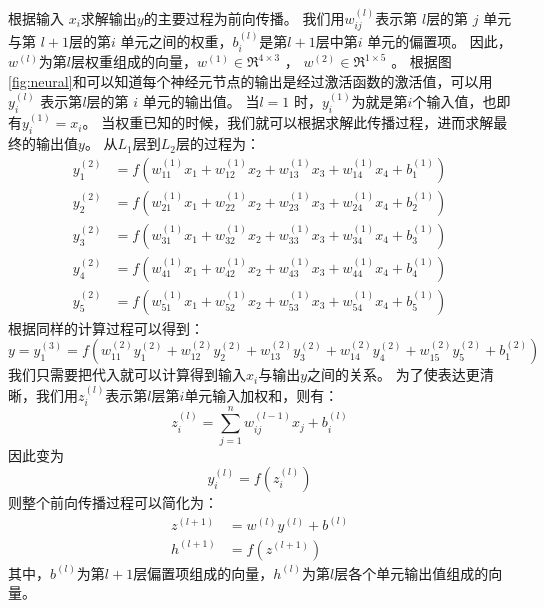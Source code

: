 根据输入 $x_i$求解输出$y$的主要过程为前向传播。
我们用$ w^{(l)}_{ij}$表示第 $ l $层的第 $ j$ 单元与第 $ l+1 $层的第$  i$ 单元之间的权重，$ b^{(l)}_i $是第$  l+1 $层中第$  i$ 单元的偏置项。
因此，$w^{(l)}$为第$l$层权重组成的向量，$ w^{(1)} \in \Re^{4\times 3}$ ， $ w^{(2)} \in \Re^{1\times 5}$ 。
根据图\ref{fig:neural}和可以知道每个神经元节点的输出是经过激活函数的激活值，可以用$ y^{(l)}_i$ 表示第$  l $层的第 $ i$ 单元的输出值。
当$  l=1$ 时，$  y^{(1)}_i$为就是第$  i $个输入值，也即有$  y^{(1)}_i = x_i $。
当权重已知的时候，我们就可以根据求解此传播过程，进而求解最终的输出值$y$。
从$L_1$层到$L_2$层的过程为：
\begin{align}
  y_1^{(2)} &= f(w_{11}^{(1)}x_1 + w_{12}^{(1)} x_2 + w_{13}^{(1)} x_3 + w_{14}^{(1)} x_4 + b_1^{(1)})  \\
  y_2^{(2)} &= f(w_{21}^{(1)}x_1 + w_{22}^{(1)} x_2 + w_{23}^{(1)} x_3 + w_{24}^{(1)} x_4 + b_2^{(1)})  \\
  y_3^{(2)} &= f(w_{31}^{(1)}x_1 + w_{32}^{(1)} x_2 + w_{33}^{(1)} x_3 + w_{34}^{(1)} x_4 + b_3^{(1)})  \\
  y_4^{(2)} &= f(w_{41}^{(1)}x_1 + w_{42}^{(1)} x_2 + w_{43}^{(1)} x_3 + w_{44}^{(1)} x_4 + b_4^{(1)})  \\
  y_5^{(2)} &= f(w_{51}^{(1)}x_1 + w_{52}^{(1)} x_2 + w_{53}^{(1)} x_3 + w_{54}^{(1)} x_4 + b_5^{(1)})
  \label{equ:fp1}
\end{align}
根据同样的计算过程可以得到：
\begin{equation}
  y = y_1^{(3)} =  f(w_{11}^{(2)} y_1^{(2)} + w_{12}^{(2)} y_2^{(2)} + w_{13}^{(2)} y_3^{(2)} + w_{14}^{(2)} y_4^{(2)} + w_{15}^{(2)} y_5^{(2)} + b_1^{(2)})
  \label{equ:fp2}
\end{equation}
我们只需要把代入就可以计算得到输入$x_i$与输出$y$之间的关系。
为了使表达更清晰，我们用$ z^{(l)}_i $表示第$ l $层第$  i$单元输入加权和，则有：
\begin{equation}
  z_i^{(l)} = \sum_{j=1}^n w^{(l-1)}_{ij} x_j + b^{(l)}_i
\end{equation}
因此变为
\begin{equation}
  y^{(l)}_i = f(z^{(l)}_i)
\end{equation}
则整个前向传播过程可以简化为：
\begin{align}
  z^{(l+1)} &= w^{(l)} y^{(l)} + b^{(l)}   \\
  h^{(l+1)} &= f(z^{(l+1)})
\end{align}
其中，$b^{(l)}$为第$l+1$层偏置项组成的向量，$h^{(l)}$为第$l$层各个单元输出值组成的向量。

